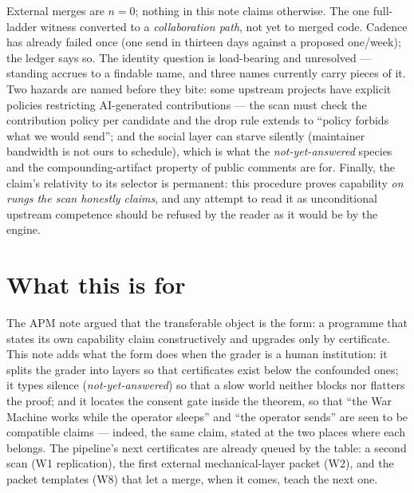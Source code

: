 \documentclass[11pt]{article}
\begin{document}
External merges are $n{=}0$; nothing in this note claims otherwise.
The one full-ladder witness converted to a \emph{collaboration
path}, not yet to merged code. Cadence has already failed once (one
send in thirteen days against a proposed one/week); the ledger says
so. The identity question is load-bearing and unresolved --- standing
accrues to a findable name, and three names currently carry pieces of
it. Two hazards are named before they bite: some upstream projects
have explicit policies restricting AI-generated contributions ---
the scan must check the contribution policy per candidate and the
drop rule extends to ``policy forbids what we would send''; and the
social layer can starve silently (maintainer bandwidth is not ours to
schedule), which is what the \emph{not-yet-answered} species and the
compounding-artifact property of public comments are for. Finally,
the claim's relativity to its selector is permanent: this procedure
proves capability \emph{on rungs the scan honestly claims}, and any
attempt to read it as unconditional upstream competence should be
refused by the reader as it would be by the engine.

\section{What this is for}

The APM note argued that the transferable object is the form: a
programme that states its own capability claim constructively and
upgrades only by certificate. This note adds what the form does when
the grader is a human institution: it splits the grader into layers
so that certificates exist below the confounded ones; it types
silence (\emph{not-yet-answered}) so that a slow world neither
blocks nor flatters the proof; and it locates the consent gate
inside the theorem, so that ``the War Machine works while the
operator sleeps'' and ``the operator sends'' are seen to be
compatible claims --- indeed, the same claim, stated at the two
places where each belongs. The pipeline's next certificates are
already queued by the table: a second scan (W1 replication), the
first external mechanical-layer packet (W2), and the packet
templates (W8) that let a merge, when it comes, teach the next one.
\end{document}

